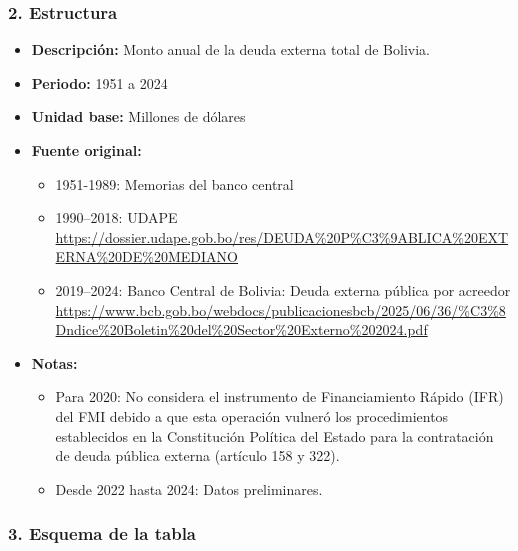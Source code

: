 \documentclass[12pt,a4paper]{article}
\begin{document}
\subsubsection*{2. Estructura}
\begin{itemize}
  \item \textbf{Descripción:} Monto anual de la deuda externa total de Bolivia.
  \item \textbf{Periodo:} 1951 a 2024
  \item \textbf{Unidad base:} Millones de dólares
  \item \textbf{Fuente original:}
  \begin{itemize}
    \item 1951-1989: Memorias del banco central
    \item 1990–2018: UDAPE
        \url{https://dossier.udape.gob.bo/res/DEUDA%20P%C3%9ABLICA%20EXTERNA%20DE%20MEDIANO}
    \item 2019–2024: Banco Central de Bolivia: Deuda externa pública por acreedor\\
      \url{https://www.bcb.gob.bo/webdocs/publicacionesbcb/2025/06/36/%C3%8Dndice%20Boletin%20del%20Sector%20Externo%202024.pdf}
  \end{itemize}
  \item \textbf{Notas:}
  \begin{itemize}
    \item Para 2020: No considera el instrumento de Financiamiento Rápido (IFR) del FMI debido a que esta operación vulneró los procedimientos establecidos en la Constitución Política del Estado para la contratación de deuda pública externa (artículo 158 y 322).
    \item Desde 2022 hasta 2024: Datos preliminares.
  \end{itemize}
\end{itemize}

\subsubsection*{3. Esquema de la tabla}
\end{document}
